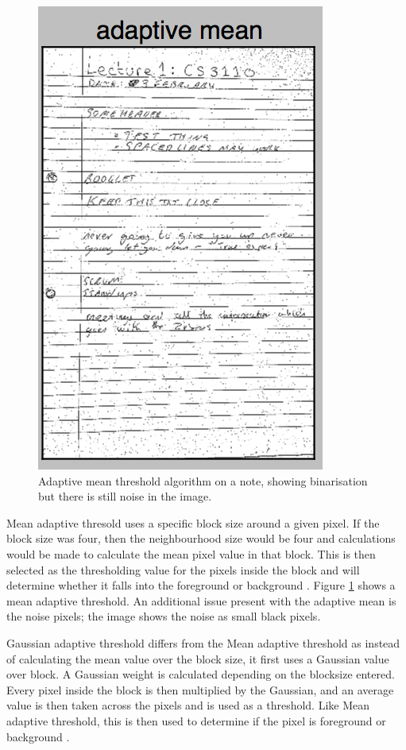 \begin{figure}[H]
  \centering
  \includegraphics{images/adaptive_mean}
  \caption{Adaptive mean threshold algorithm on a note, showing binarisation but there is still noise in the image.}
  \label{fig:adaptive_mean}
\end{figure}

Mean adaptive thresold uses a specific block size around a given pixel. If the block size was four, then the neighbourhood size would be four and calculations would be made to calculate the mean pixel value in that block. This is then selected as the thresholding value for the pixels inside the block and will determine whether it falls into the foreground or background \cite{citeulike:14021401}. Figure \ref{fig:adaptive_mean} shows a mean adaptive threshold. An additional issue present with the adaptive mean is the noise pixels; the image shows the noise as small black pixels.

Gaussian adaptive threshold differs from the Mean adaptive threshold as instead of calculating the mean value over the block size, it first uses a Gaussian value over block. A Gaussian weight is calculated depending on the blocksize entered. Every pixel inside the block is then multiplied by the Gaussian, and an average value is then taken across the pixels and is used as a threshold. Like Mean adaptive threshold, this is then used to determine if the pixel is foreground or background \cite{bradski2008learning}\cite{citeulike:1402140}.


